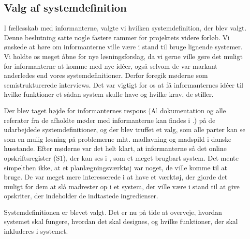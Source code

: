 \subsection{Valg af systemdefinition}
\label{subsec:valgafsystemdefinition}

I fællesskab med informanterne, valgte vi hvilken systemdefinition, der blev valgt. Denne beslutning satte nogle fastere rammer for projektets videre forløb. Vi ønskede at høre om informanterne ville være i stand til bruge lignende systemer. Vi holdte os meget åbne for nye løsningsforslag, da vi gerne ville gøre det muligt for informanterne at komme med nye idéer, også selvom de var markant anderledes end vores systemdefinitioner. Derfor foregik møderne som semistrukturerede interviews. Det var vigtigt for os at få informanternes idéer til hvilke funktioner et sådan system skulle have og hvilke krav, de stiller.

Der blev taget højde for informanternes respons (Al dokumentation og alle referater fra de afholdte møder med informanterne kan findes i .) på de udarbejdede systemdefinitioner, og der blev truffet et valg, som alle parter kan se som en mulig løsning på problemerne mht. madlavning og madspild i danske husstande. Efter møderne var det helt klart, at informanterne så det online opskriftsregister (S1), der kan ses i , som et meget brugbart system. Det mente simpelthen ikke, at et planlægningsværktøj var noget, de ville komme til at bruge. De var meget mere interesserede i at have et værktøj, der gjorde det muligt for dem at slå madrester op i et system, der ville være i stand til at give opskriter, der indeholder de indtastede ingredienser.

Systemdefinitionen er blevet valgt. Det er nu på tide at overveje, hvordan systemet skal fungere, hvordan det skal designes, og hvilke funktioner, der skal inkluderes i systemet.
